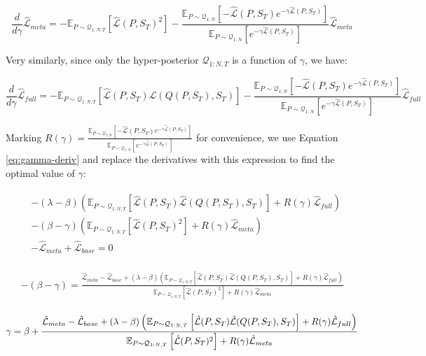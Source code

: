 \documentclass{article}
\theoremstyle{definition}
\newcommand{\Expect}[2]{\mathbb{E}_{#1}\left [#2 \right ]}
\begin{document}
$$\frac{d}{d\gamma}\hat{\mathcal{L}}_{meta}=-\Expect{P\sim \mathcal{Q}_{1:N,T}}{\hat{\mathcal{L}}(P,S_T)^2}-\frac{\Expect{P\sim \mathcal{Q}_{1:N}}{-\hat{\mathcal{L}}(P,S_T)e^{-\gamma\hat{\mathcal{L}}(P,S_T)} }}{\Expect{P\sim \mathcal{Q}_{1:N}}{e^{-\gamma\hat{\mathcal{L}}(P,S_T)}} }\hat{\mathcal{L}}_{meta} $$

Very similarly, since only the hyper-posterior $\mathcal{Q}_{1:N,T}$ is a 
function of $\gamma$, we have:

$$\frac{d}{d\gamma}\hat{\mathcal{L}}_{full}=-\Expect{P\sim \mathcal{Q}_{1:N,T}}{\hat{\mathcal{L}}(P,S_T)\hat{\mathcal{L}}\left (Q(P,S_T),S_T\right )}-\frac{\Expect{P\sim \mathcal{Q}_{1:N}}{-\hat{\mathcal{L}}(P,S_T)e^{-\gamma\hat{\mathcal{L}}(P,S_T)} }}{\Expect{P\sim \mathcal{Q}_{1:N}}{e^{-\gamma\hat{\mathcal{L}}(P,S_T)}} }\hat{\mathcal{L}}_{full} $$

Marking $R(\gamma)=\frac{\Expect{P\sim \mathcal{Q}_{1:N}}{-\hat{\mathcal{L}}(P,S_T)e^{-\gamma\hat{\mathcal{L}}(P,S_T)} }}{\Expect{P\sim \mathcal{Q}_{1:N}}{e^{-\gamma\hat{\mathcal{L}}(P,S_T)}} }$ for convenience, we use Equation \ref{eq:gamma-deriv} and replace the derivatives with this expression to find the optimal value of $\gamma$: 

\begin{align*} 
\begin{split}
&-(\lambda-\beta)\left (\Expect{P\sim \mathcal{Q}_{1:N,T}}{\hat{\mathcal{L}}(P,S_T)\hat{\mathcal{L}}\left (Q(P,S_T),S_T\right )}+R(\gamma)\hat{\mathcal{L}}_{full}\right )\\& - (\beta-\gamma)\left (\Expect{P\sim \mathcal{Q}_{1:N,T}}{\hat{\mathcal{L}}(P,S_T)^2}+R(\gamma)\hat{\mathcal{L}}_{meta}\right )\\& - \hat{\mathcal{L}}_{meta}+\hat{\mathcal{L}}_{base} = 0
\end{split}
\end{align*}

\begin{align*} 
\begin{split}
-(\beta-\gamma) = \frac{\hat{\mathcal{L}}_{meta}-\hat{\mathcal{L}}_{base}+(\lambda-\beta)
	\left (\Expect{P\sim \mathcal{Q}_{1:N,T}}{\hat{\mathcal{L}}(P,S_T)\hat{\mathcal{L}}(Q(P,S_T),S_T)}+R(\gamma)\hat{\mathcal{L}}_{full}\right )}{\Expect{P\sim \mathcal{Q}_{1:N,T}}{\hat{\mathcal{L}}(P,S_T)^2}+R(\gamma)\hat{\mathcal{L}}_{meta}}
\end{split}
\end{align*}

\begin{align} \label{eq:meta-pb-gamma}
\begin{split}
\gamma = \beta+\frac{\hat{\mathcal{L}}_{meta}-\hat{\mathcal{L}}_{base}+(\lambda-\beta)\left (\Expect{P\sim \mathcal{Q}_{1:N,T}}{\hat{\mathcal{L}}(P,S_T)\hat{\mathcal{L}}(Q(P,S_T),S_T)}+R(\gamma)\hat{\mathcal{L}}_{full}\right )}{\Expect{P\sim \mathcal{Q}_{1:N,T}}{\hat{\mathcal{L}}(P,S_T)^2}+R(\gamma)\hat{\mathcal{L}}_{meta}}
\end{split}\hfill
\end{align}
\end{document}
